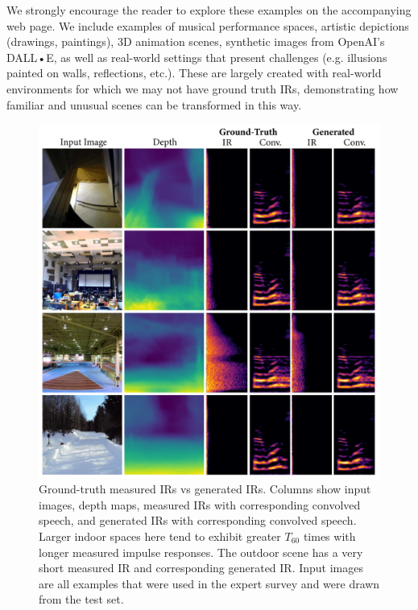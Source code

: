 \documentclass[10pt,twocolumn,letterpaper]{article}
\begin{document}
We strongly encourage the reader to explore these examples on the accompanying web page. We include examples of musical performance spaces, artistic depictions (drawings, paintings), 3D animation scenes, synthetic images from OpenAI's DALL•E, as well as real-world settings that present challenges (e.g. illusions painted on walls, reflections, etc.). These are largely created with real-world environments for which we may not have ground truth IRs, demonstrating how familiar and unusual scenes can be transformed in this way.


\begin{figure}
    \centering
    \includegraphics[width=\columnwidth]{p_gt_ir_sig.png}
    \caption{Ground-truth measured IRs vs generated IRs. Columns show input images, depth maps, measured IRs with corresponding convolved speech, and generated IRs with corresponding convolved speech. Larger indoor spaces here tend to exhibit greater ${T_{60}}$ times with longer measured impulse responses. The outdoor scene has a very short measured IR and corresponding generated IR. Input images are all examples that were used in the expert survey and were drawn from the test set.}
    \label{fig:p_groundtruth}
\end{figure}
\end{document}
